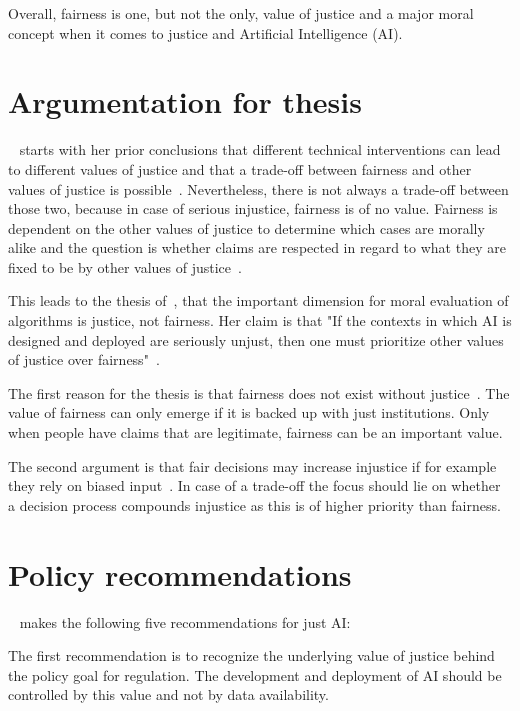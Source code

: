 Overall, fairness is one, but not the only, value of justice and a major moral concept when it comes to justice and Artificial Intelligence (AI).~\parencite[][11, 13]{vredenburgh}

\section*{Argumentation for thesis}

~\cite{vredenburgh} starts with her prior conclusions that different technical interventions can lead to different values of justice and that a trade-off between fairness and other values of justice is possible~\parencite[][18]{vredenburgh}.
Nevertheless, there is not always a trade-off between those two, because in case of serious injustice, fairness is of no value.
Fairness is dependent on the other values of justice to determine which cases are morally alike and the question is whether claims are respected in regard to what they are fixed to be by other values of justice~\parencite[][18, 19]{vredenburgh}.

This leads to the thesis of~\cite{vredenburgh}, that the important dimension for moral evaluation of algorithms is justice, not fairness.
Her claim is that "If the contexts in which AI is designed and deployed are seriously unjust, then one must prioritize other values of justice over fairness"~\parencite[][19]{vredenburgh}.

The first reason for the thesis is that fairness does not exist without justice~\parencite[][19]{vredenburgh}.
The value of fairness can only emerge if it is backed up with just institutions.
Only when people have claims that are legitimate, fairness can be an important value.

The second argument is that fair decisions may increase injustice if for example they rely on biased input~\parencite[][19]{vredenburgh}.
In case of a trade-off the focus should lie on whether a decision process compounds injustice as this is of higher priority than fairness.

\section*{Policy recommendations}

~\cite{vredenburgh} makes the following five recommendations for just AI:

The first recommendation is to recognize the underlying value of justice behind the policy goal for regulation.
The development and deployment of AI should be controlled by this value and not by data availability.


